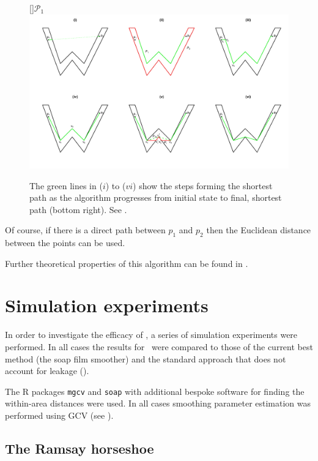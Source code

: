 \begin{figure}
\centering
[]{$\mathcal{P}_1$}
\includegraphics[trim=0in 0.5in 0in 0.25in, width=9.5in]{mds/figs/wdia.pdf} \\
\caption{The green lines in ($i$) to ($vi$) show the steps forming the shortest path as the algorithm progresses from initial state to final, shortest path (bottom right). See .}
\label{wdia}
\end{figure}

Of course, if there is a direct path between $p_1$ and $p_2$ then the Euclidean distance between the points can be used.

Further theoretical properties of this algorithm can be found in .

\section{Simulation experiments}
\label{mdssims}

In order to investigate the efficacy of \mdsap, a series of simulation experiments were performed. In all cases the results for \mdsap\ were compared to those of the current best method (the soap film smoother) and the standard approach that does not account for leakage (\tprs).

The \textsf{R} packages \texttt{mgcv} and \texttt{soap} with additional bespoke software for finding the within-area distances were used. In all cases smoothing parameter estimation was performed using GCV (see ).

\subsection{The Ramsay horseshoe}

